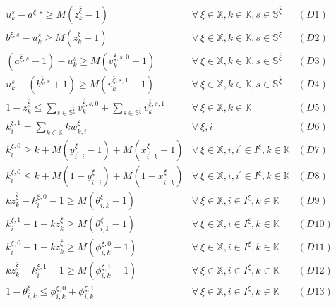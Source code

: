 \documentclass[]{interact}
\theoremstyle{plain}%
\theoremstyle{definition}
\theoremstyle{remark}
\begin{document}
\begin{eqnarray}
u^s_k - a^{\bar{\xi},s} \ge M(z^{\bar{\xi}}_{k}-1)&\forall\ \xi\in \mathbb{X},k\in \mathbb{K},s\in \mathbb{S}^{\bar{\xi}}&(D1)\nonumber\\
b^{\bar{\xi},s} - u^s_k \ge M(z^{\bar{\xi}}_{k}-1)&\forall\ \xi\in \mathbb{X},k\in \mathbb{K},s\in \mathbb{S}^{\bar{\xi}}&(D2)\nonumber\\
( a^{\bar{\xi},s}-1) - u^s_k \ge M(v^{\bar{\xi},s,0}_k-1) & \forall\ \xi\in \mathbb{X},k\in \mathbb{K},s\in \mathbb{S}^{\bar{\xi}} &(D3)\nonumber\\
u^s_k -  (b^{\bar{\xi},s}+1) \ge M(v^{\bar{\xi},s,1}_k-1) & \forall\ \xi\in \mathbb{X},k\in \mathbb{K},s\in \mathbb{S}^{\bar{\xi}} &(D4)\nonumber\\
1 - z^{\bar{\xi}}_{k} \le \sum_{s\in \mathbb{S}^{\bar{\xi}}} v^{\bar{\xi},s,0}_k + \sum_{s\in \mathbb{S}^{\bar{\xi}}} v^{\bar{\xi},s,1}_k&\forall\ \xi\in \mathbb{X},k\in \mathbb{K}&(D5)\nonumber\\
k^{\xi,1}_i = \sum_{k\in \mathbb{K}}kw^{\xi}_{k,i}&\forall\ \xi,i&(D6)\nonumber\\
k^{\xi,0}_i \ge k + M(y^{\xi}_{i^{'},i}-1) + M(x^{\xi}_{i^{'},k}-1) & \forall\ \xi\in \mathbb{X},i,i^{'}\in I^{\xi},k\in \mathbb{K}& (D7)\nonumber\\
k^{\xi,0}_i \le k + M(1-y^{\xi}_{i^{'},i}) + M(1-x^{\xi}_{i^{'},k}) &  \forall\ \xi\in \mathbb{X},i,i^{'}\in I^{\xi},k\in \mathbb{K}&(D8)\nonumber\\
kz^{\bar{\xi}}_k -k^{\xi,0}_i - 1 \ge M(\theta^{\xi}_{i,k}-1)& \forall\ \xi\in \mathbb{X},i\in I^{\xi},k\in \mathbb{K}&(D9)\nonumber\\
k^{\xi,1}_i - 1 - kz^{\bar{\xi}}_k \ge M(\theta^{\xi}_{i,k}-1)& \forall\ \xi\in \mathbb{X},i\in I^{\xi},k\in \mathbb{K}&(D10)\nonumber\\
k^{\xi,0}_i-1 - kz^{\bar{\xi}}_k \ge M(\phi^{\xi,0}_{i,k}-1)&\forall\ \xi\in \mathbb{X},i\in I^{\xi},k\in \mathbb{K}&(D11)\nonumber\\
kz^{\bar{\xi}}_k - k^{\xi,1}_i - 1\ge M(\phi^{\xi,1}_{i,k}-1)&\forall\ \xi\in \mathbb{X},i\in I^{\xi},k\in \mathbb{K}&(D12)\nonumber\\
1-\theta^{\xi}_{i,k} \le \phi^{\xi,0}_{i,k} + \phi^{\xi,1}_{i,k}&\forall\ \xi\in \mathbb{X},i\in I^{\xi},k\in \mathbb{K}&(D13)\nonumber\\

\end{eqnarray}
\end{document}
